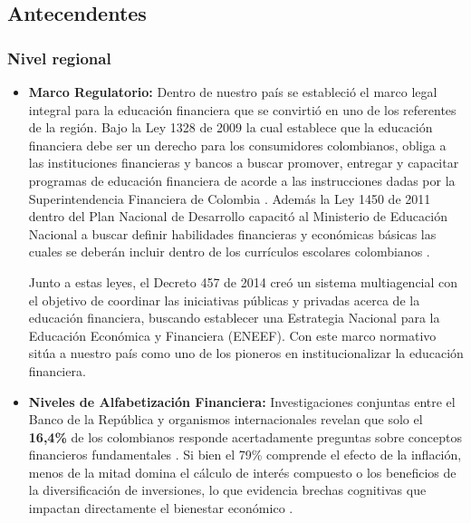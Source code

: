{}
\subsection*{Antecendentes}

{}
\subsubsection*{Nivel regional}
\begin{itemize}
	\item \textbf{Marco Regulatorio:} Dentro de nuestro país se estableció el marco legal integral para la educación financiera que se convirtió en uno de los referentes de la región. Bajo la Ley 1328 de 2009 la cual establece que la educación financiera debe ser un derecho para los consumidores colombianos, obliga a las instituciones financieras y bancos a buscar promover, entregar y capacitar programas de educación financiera de acorde a las instrucciones dadas por la Superintendencia Financiera de Colombia \parencite[p. 10]{Superintendencia01}. Además la Ley 1450 de 2011 dentro del Plan Nacional de Desarrollo capacitó al Ministerio de Educación Nacional a buscar definir habilidades financieras y económicas básicas las cuales se deberán incluir dentro de los currículos escolares colombianos \parencite[p. 15]{Superintendencia01}.
	
	Junto a estas leyes, el Decreto 457 de 2014 creó un sistema multiagencial con el objetivo de coordinar las iniciativas públicas y privadas acerca de la educación financiera, buscando establecer una Estrategia Nacional para la Educación Económica y Financiera (ENEEF). Con este marco normativo sitúa a nuestro país como uno de los pioneros en institucionalizar la educación financiera.
	
	\item \textbf{Niveles de Alfabetización Financiera:} Investigaciones conjuntas entre el Banco de la República y organismos internacionales revelan que solo el \textbf{16,4\%} de los colombianos responde acertadamente preguntas sobre conceptos financieros fundamentales \parencite[p. 22]{BancoMundial01}. Si bien el 79\% comprende el efecto de la inflación, menos de la mitad domina el cálculo de interés compuesto o los beneficios de la diversificación de inversiones, lo que evidencia brechas cognitivas que impactan directamente el bienestar económico \parencite[p. 25]{ComisionIntersectorial01}.
	

\end{itemize}
